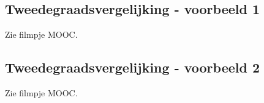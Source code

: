 



\subsection{Tweedegraadsvergelijking - voorbeeld 1}
Zie filmpje MOOC.
\subsection{Tweedegraadsvergelijking - voorbeeld 2}
Zie filmpje MOOC.
%
%









